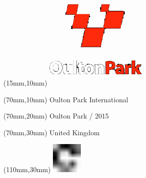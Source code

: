 \null\newpage
\begin{textblock*}{50mm}(15mm,10mm)%
\includegraphics[width=50mm]{LG/OUL.png}
\end{textblock*}
\begin{textblock*}{130mm}(70mm,10mm)%
{\fontsize{20}{20}\selectfont Oulton Park International}\\
\end{textblock*}
\begin{textblock*}{120mm}(70mm,20mm)%
{\fontsize{16}{16}\selectfont Oulton Park / 2015}\\
\end{textblock*}
\begin{textblock*}{120mm}(70mm,30mm)%
{\fontsize{12}{12}\selectfont United Kingdom}
\end{textblock*}
\begin{textblock*}{30mm}(110mm,30mm)%
\centering
\includegraphics[height=15mm]{icons/fa-rotate-right.pdf}
\end{textblock*}

